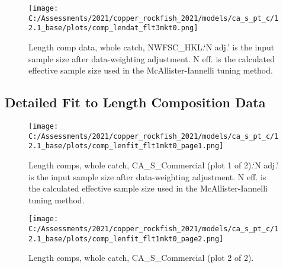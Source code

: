 \documentclass[11pt,
  english,
  a4paper,
]{article}
\begin{document}
\begin{figure}
\centering
\texttt{[image: C:/Assessments/2021/copper\_rockfish\_2021/models/ca\_s\_pt\_c/12.1\_base/plots/comp\_lendat\_flt3mkt0.png]}
\caption{Length comp data, whole catch, NWFSC\_HKL.`N adj.' is the input sample size after data-weighting adjustment. N eff. is the calculated effective sample size used in the McAllister-Iannelli tuning method.\label{fig:comp_lendat_flt3mkt0}}
\end{figure}

\tagmcend\tagstructend

\newpage


\hypertarget{length-fit}{%
\subsection{Detailed Fit to Length Composition Data}\label{length-fit}}

\leavevmode\tagmcend\tagstructend


\begin{figure}
\centering
\texttt{[image: C:/Assessments/2021/copper\_rockfish\_2021/models/ca\_s\_pt\_c/12.1\_base/plots/comp\_lenfit\_flt1mkt0\_page1.png]}
\caption{Length comps, whole catch, CA\_S\_Commercial (plot 1 of 2).`N adj.' is the input sample size after data-weighting adjustment. N eff. is the calculated effective sample size used in the McAllister-Iannelli tuning method.\label{fig:comp_lenfit_flt1mkt0_page1}}
\end{figure}

\tagmcend\tagstructend


\begin{figure}
\centering
\texttt{[image: C:/Assessments/2021/copper\_rockfish\_2021/models/ca\_s\_pt\_c/12.1\_base/plots/comp\_lenfit\_flt1mkt0\_page2.png]}
\caption{Length comps, whole catch, CA\_S\_Commercial (plot 2 of 2).\label{fig:comp_lenfit_flt1mkt0_page2}}
\end{figure}
\end{document}
